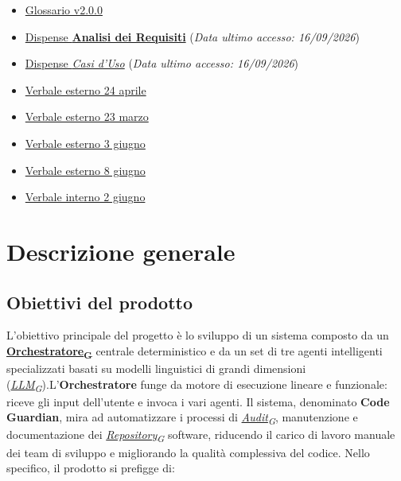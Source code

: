 \documentclass[12pt, a4paper]{article}
\newcommand{\urlglossario}{https://skynetunigroup.github.io/Code_Guardian/Documentazione/PB/glossario_v2.0.0.pdf} %
\newcommand{\glo}[2]{\href{\urlglossario\#nameddest=#2}{#1\textsubscript{G}}}
\begin{document}
\begin{itemize}
\item
  \href{https://skynetunigroup.github.io/Code_Guardian/Documentazione/PB/glossario_v2.0.0.pdf}{Glossario v2.0.0}
\item
  \href{https://www.math.unipd.it/~tullio/IS-1/2025/Dispense/T05.pdf}{Dispense
  \textbf{Analisi dei Requisiti}} (\textit{Data ultimo accesso: 16/09/2026})
\item
  \href{https://www.math.unipd.it/~rcardin/swea/2022/Diagrammi\%20Use\%20Case.pdf}{Dispense
  \textit{Casi d'Uso}} (\textit{Data ultimo accesso: 16/09/2026})
  
  \item \href{https://skynetunigroup.github.io/Code_Guardian/Documentazione/Verbali/Esterni/VE_2026_04_24.pdf}{Verbale esterno 24 aprile}

\item \href{https://skynetunigroup.github.io/Code_Guardian/Documentazione/Verbali/Esterni/VE_2026_03_23.pdf}{Verbale esterno 23 marzo}

\item \href{https://skynetunigroup.github.io/Code_Guardian/Documentazione/Verbali/Esterni/VE_2026_06_03.pdf}{Verbale esterno 3 giugno}

\item \href{https://skynetunigroup.github.io/Code_Guardian/Documentazione/Verbali/Esterni/VE_2026_06_08.pdf}{Verbale esterno 8 giugno}

\item \href{https://skynetunigroup.github.io/Code_Guardian/Documentazione/Verbali/Interni/VI_2026_06_02.pdf}{Verbale interno 2 giugno}


\end{itemize}

\newpage
\section{Descrizione generale}

\subsection{Obiettivi del prodotto}

L'obiettivo principale del progetto è lo sviluppo di un sistema composto da un \textbf{\glo{Orchestratore}{orchestratore}} centrale deterministico e da un set di tre agenti intelligenti specializzati basati su modelli linguistici di grandi dimensioni (\textit{\glo{LLM}{llm}}).L'\textbf{Orchestratore} funge da motore di esecuzione lineare e funzionale: riceve gli input dell'utente e invoca i vari agenti. Il sistema, denominato \textbf{Code Guardian}, mira ad automatizzare i processi di \textit{\glo{Audit}{audit}}, manutenzione e
documentazione dei \textit{\glo{Repository}{repository}} software, riducendo il carico di lavoro
manuale dei team di sviluppo e migliorando la qualità complessiva del
codice. Nello specifico, il prodotto si prefigge di:
\end{document}
